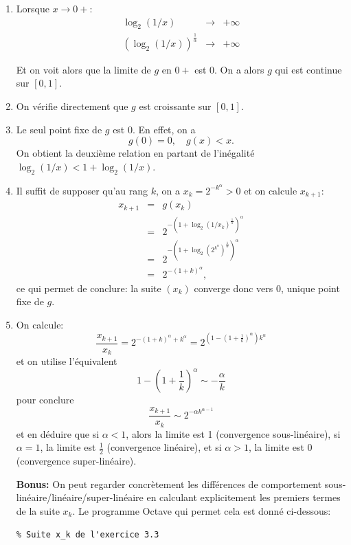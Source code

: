 \documentclass{article}
\begin{document}
\begin{enumerate}
    \item Lorsque $x \rightarrow 0+$:
    \begin{eqnarray*}
    \log_2 (1/x) & \rightarrow & +\infty\\
    (\log_2 (1/x))^{\frac{1}{\alpha}} & \rightarrow & +\infty
    \end{eqnarray*}

    Et on voit alors que la limite de $g$ en $0+$ est $0$. On a alors $g$ qui est continue sur $[0,1]$.

\item On vérifie directement que $g$ est croissante sur $[0,1]$.

\item Le seul point fixe de $g$ est $0$. En effet, on a
\[
g(0) = 0, \quad g(x) < x.
\]
On obtient la deuxième relation en partant de l'inégalité $\log_2 (1/x) < 1 + \log_2 (1/x)$.

\item Il suffit de supposer qu'au rang $k$, on a $x_k = 2^{-k^\alpha} > 0$ et on calcule $x_{k+1}$:
\begin{eqnarray*}
x_{k+1} & = & g(x_k)\\
& = & 2^{-(1+\log_2(1/x_k)^{\frac{1}{\alpha}})^\alpha}\\
& = & 2^{-(1+\log_2(2^{k^\alpha})^{\frac{1}{\alpha}})^\alpha}\\
& = & 2^{-(1+k)^\alpha},
\end{eqnarray*}
ce qui permet de conclure: la suite $(x_k)$ converge donc vers $0$, unique point fixe de $g$.

\item On calcule:
\[
\frac{x_{k+1}}{x_k} = 2^{-(1+k)^\alpha + k^\alpha }
 = 2^{\left (1 -\left (1+\frac{1}{k} \right )^\alpha \right ) k^\alpha}
\]
et on utilise l'équivalent
\[
1 -\left (1+\frac{1}{k} \right)^\alpha \sim -\frac{\alpha}{k} 
\]
pour conclure
\[
\frac{x_{k+1}}{x_k} \sim 2^{-\alpha k^{\alpha-1}}
\]
et en déduire que si $\alpha < 1$, alors la limite est 1 (convergence sous-linéaire), si $\alpha = 1$, la limite est $\frac12$ (convergence linéaire), et si $\alpha > 1$, la limite est 0 (convergence super-linéaire).

{\bf Bonus:} On peut regarder concrètement les différences de comportement sous-linéaire/linéaire/super-linéaire en calculant explicitement les premiers termes de la suite $x_k$. Le programme Octave qui permet cela est donné ci-dessous:

\begin{verbatim}
% Suite x_k de l'exercice 3.3


\end{verbatim}
\end{enumerate}
\end{document}
